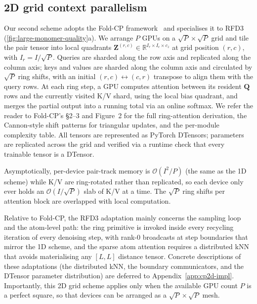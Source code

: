 \documentclass{article}
\theoremstyle{plain}
\theoremstyle{definition}
\theoremstyle{remark}
\begin{document}
\subsection{2D grid context parallelism}
\label{sec:2d}

Our second scheme adopts the Fold-CP framework~\cite{lin_fold-cp_2026} and specialises it to RFD3 (\cref{fig:large-monomer-quality}a). We arrange $P$ GPUs on a $\sqrt{P}\times\sqrt{P}$ grid and tile the pair tensor into local quadrants $\mathbf{Z}^{(r,c)}\in\mathbb{R}^{I_r\times I_c\times c_z}$ at grid position $(r,c)$, with $I_r=I/\sqrt{P}$. Queries are sharded along the row axis and replicated along the column axis; keys and values are sharded along the column axis and circulated by $\sqrt{P}$ ring shifts, with an initial $(r,c)\leftrightarrow(c,r)$ transpose to align them with the query rows. At each ring step, a GPU computes attention between its resident $\mathbf{Q}$ rows and the currently visited K/V shard, using the local bias quadrant, and merges the partial output into a running total via an online softmax. We refer the reader to Fold-CP's \S2--3 and Figure~2 for the full ring-attention derivation, the Cannon-style shift patterns for triangular updates, and the per-module complexity table. All tensors are represented as PyTorch DTensors; parameters are replicated across the grid and verified via a runtime check that every trainable tensor is a DTensor.

Asymptotically, per-device pair-track memory is $\mathcal{O}(I^{2}/P)$  (the same as the 1D scheme) while K/V are ring-rotated rather than replicated, so each device only ever holds an $\mathcal{O}(I/\sqrt{P})$ slab of K/V at a time. The $\sqrt{P}$ ring shifts per attention block are overlapped with local computation.

Relative to Fold-CP, the RFD3 adaptation mainly concerns the sampling loop and the atom-level path: the ring primitive is invoked inside every recycling iteration of every denoising step, with rank-$0$ broadcasts at step boundaries that mirror the 1D scheme, and the sparse atom attention requires a distributed kNN that avoids materialising any $[L,L]$ distance tensor. Concrete descriptions of these adaptations (the distributed kNN, the boundary communicators, and the DTensor parameter distribution) are deferred to Appendix~\ref{app:cp2d-impl}. Importantly, this 2D grid scheme applies only when the available GPU count $P$ is a perfect square, so that devices can be arranged as a $\sqrt{P}\times\sqrt{P}$ mesh.
\end{document}

